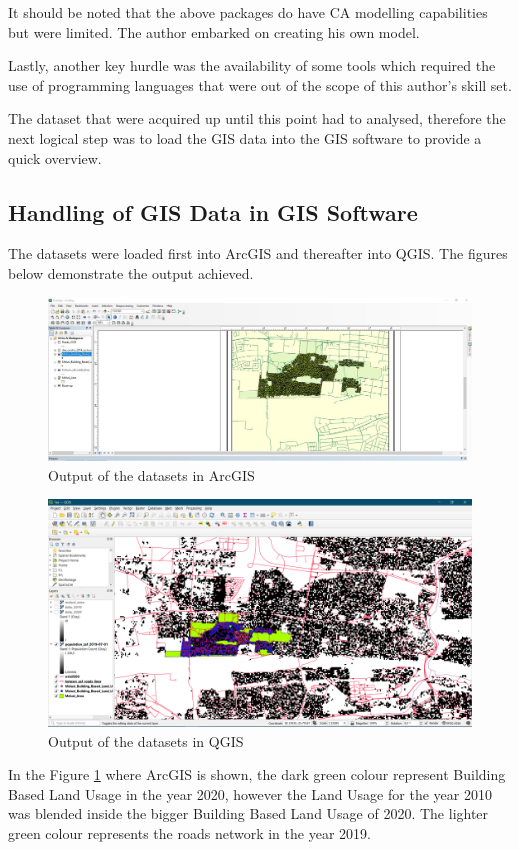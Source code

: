 It should be noted that the above packages do have CA modelling capabilities but were limited. The author embarked on creating his own model.

Lastly, another key hurdle was the availability of some tools which required the use of programming languages that were out of the scope of this author's skill set.

The dataset that were acquired up until this point had to analysed, therefore the next logical step was to load the GIS data into the GIS software to provide a quick overview.
\subsection{Handling of GIS Data in GIS Software}
The datasets were loaded first into ArcGIS and thereafter into QGIS. The figures below demonstrate the output achieved.
\begin{figure}[H]
\centering
\includegraphics[scale=0.3]{Figures/Chapter3/ArcGIS}
\caption{Output of the datasets in ArcGIS}
\label{fig:Arc}
\end{figure}
\begin{figure}[H]
\centering
\includegraphics[scale=0.35]{Figures/Chapter3/QGIS}
\caption{Output of the datasets in QGIS}
\label{fig:Q}
\end{figure}
In the Figure \ref{fig:Arc} where ArcGIS is shown, the dark green colour represent Building Based Land Usage in the year 2020, however the Land Usage for the year 2010 was blended inside the bigger Building Based Land Usage of 2020. The lighter green colour represents the roads network in the year 2019.

